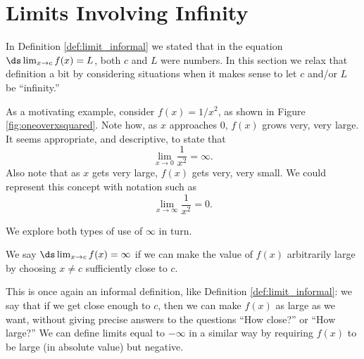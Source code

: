 \section{Limits Involving Infinity}\label{sec:limits_infty}

In Definition \ref{def:limit_informal} we stated that in the equation $\ds \lim_{x\to c}f(x) = L$, both $c$ and $L$ were numbers. In this section we relax that definition a bit by considering situations when it makes sense to let $c$ and/or $L$ be ``infinity.''

As a motivating example, consider $f(x) = 1/x^2$, as shown in Figure \ref{fig:oneoverxsquared}. Note how, as $x$ approaches 0, $f(x)$ grows very, very large. It seems appropriate, and descriptive, to state that 
\[
\lim_{x\rightarrow 0} \frac1{x^2}=\infty.
\]
Also note that as $x$ gets very large, $f(x)$ gets very, very small. We could represent this concept with notation such as 
\[
\lim_{x\rightarrow \infty} \frac1{x^2}=0.
\]


We explore both types of use of $\infty$ in turn.

{We say $\ds \lim_{x\rightarrow c} f(x)=\infty$ if we can make the value of $f(x)$ arbitrarily large by choosing $x\neq c$ sufficiently close to $c$.   
}

This is once again an informal definition, like Definition \ref{def:limit_informal}: we say that if we get close enough to $c$, then we can make $f(x)$ as large as we want, without giving precise answers to the questions ``How close?'' or ``How large?''  We can define limits equal to $-\infty$ in a similar way by requiring $f(x)$ to be large (in absolute value) but negative.




